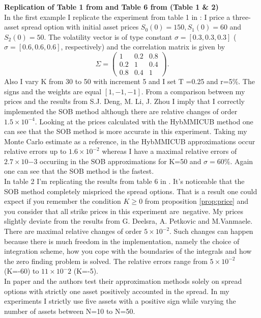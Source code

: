 \documentclass[a4paper]{article}
\begin{document}
{
\textbf{Replication of Table 1 from \cite{sob} and Table 6 from \cite{hybmmicub} (Table 1 \& 2)}\\
}
In the first example I replicate the experiment from table 1 in \cite{sob}: I price a three-asset spread option with initial asset prices $S_0(0)=150, S_1(0) = 60$ and $S_2(0) = 50.$ The volatility vector is of type constant $\sigma = [0.3, 0.3, 0.3]$ ($\sigma = [0.6, 0.6, 0.6]$, respectively) and the correlation matrix is given by 
$$\Sigma =\begin{pmatrix}1 & 0.2 & 0.8\\ 
0.2 & 1 & 0.4\\
0.8 & 0.4 & 1 \end{pmatrix}.$$
Also I vary K from 30 to 50 with increment 5 and I set T =0.25 and r=5\%. The signs and the weights are equal $[1,-1,-1]$. From a comparison between my prices and the results from S.J. Deng, M. Li, J. Zhou I imply that I correctly implemented the SOB method although there are relative changes of order $1.5\times10^{-4}$. Looking at the prices calculated with the HybMMICUB method one can see that the SOB method is more accurate in this experiment. Taking my Monte Carlo estimate as a reference, in the HybMMICUB approximations occur relative errors up to $1.6 \times 10^{-2}$ whereas I have a maximal relative errors of $2.7\times10{-3}$ occuriing in the SOB approximations for K=50 and $\sigma = 60\%$. Again one can see that the SOB method is the fastest.\\
In table 2 I'm replicating the results from table 6 in \cite{hybmmicub}. It's noticeable that the SOB method completely mispriced the spread options. That is a result one could expect if you remember the condition $K\geq0$ from proposition \ref{prop:price} and you consider that all strike prices in this experiment are\ negative. My prices slightly deviate from the results from G. Deelsra, A. Petkovic and M.Vanmaele. There are maximal relative changes of order $5\times10^{-2}$. Such changes can happen because there is much freedom in the implementation, namely the choice of integration scheme, how you cope with the boundaries of the integrals and how the zero finding problem is solved. The relative errors range from $5\times10^{-2}$ (K=-60) to $11\times10^-{2}$ (K=-5).\\
In paper \cite{sob} and \cite{hybmmicub} the authors test their approximation methods solely on spread options with strictly one asset positively accounted in the spread. In my experiments I strictly use five assets with a positive sign while varying the number of assets between N=10 to N=50.\\
\end{document}
